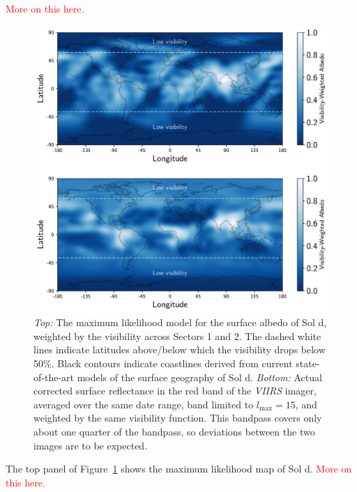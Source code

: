 \documentclass[modern]{aastex62}
\newcommand{\todo}[1]{\textcolor{red}{#1}}
\begin{document}
\todo{More on this here.}

\begin{figure}[p!]
    \begin{centering}
    \includegraphics[width=\linewidth]{figures/map.pdf}
    \caption{\label{fig:map}
             \emph{Top:} The maximum likelihood model for the surface albedo
             of Sol d, weighted by the visibility across Sectors 1 and 2. The
             dashed white lines indicate latitudes above/below which the
             visibility drops below 50\%. Black contours indicate coastlines
             derived from current state-of-the-art models of the surface geography 
             of Sol d.
             \emph{Bottom:} Actual corrected surface reflectance in the red band of the
             \emph{VIIRS} imager, averaged over the same date range, band limited
             to $l_\mathrm{max} = 15$, and weighted
             by the same visibility function. This bandpass covers only about one
             quarter of the \tess bandpass, so deviations between the two images
             are to be expected.
             }
    \end{centering}
\end{figure}



The top panel of Figure~\ref{fig:map} shows the maximum likelihood map of Sol d.
\todo{More on this here.}
\end{document}
